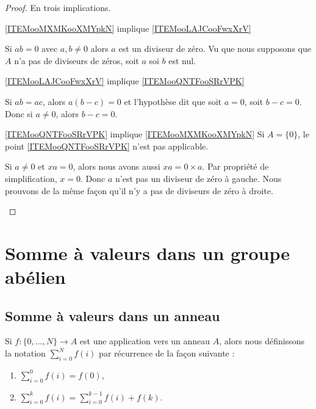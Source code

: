\begin{proof}
    En trois implications.
    \begin{subproof}
        \item[\ref{ITEMooMXMKooXMYpkN} implique \ref{ITEMooLAJCooFwxXrV}]

            Si \( ab=0\) avec \( a,b\neq 0\) alors \( a\) est un diviseur de zéro. Vu que nous supposons que \( A\) n'a pas de diviseurs de zéros, soit \( a\) soi \( b\) est nul.
        \item[\ref{ITEMooLAJCooFwxXrV} implique \ref{ITEMooQNTFooSRrVPK}]

            Si \( ab=ac\), alors \( a(b-c)=0\) et l'hypothèse dit que soit \( a=0\), soit \( b-c=0\). Donc si \( a\neq 0\), alors \( b-c=0\).
        \item[\ref{ITEMooQNTFooSRrVPK} implique \ref{ITEMooMXMKooXMYpkN}]
            Si \( A=\{ 0 \}\), le point \ref{ITEMooQNTFooSRrVPK} n'est pas applicable.

            Si \( a\neq 0\) et \( xa=0\), alors nous avons aussi \( xa=0\times a\). Par propriété de simplification, \( x=0\). Donc \( a\) n'est pas un diviseur de zéro à gauche. Nous prouvons de la même façon qu'il n'y a pas de diviseurs de zéro à droite.
    \end{subproof}
\end{proof}

\section{Somme à valeurs dans un groupe abélien}

\subsection{Somme à valeurs dans un anneau}

\begin{definition}      \label{DEFooNEVNooJlmJOC}
    Si \( f\colon \{ 0,\ldots, N \}\to A\) est une application vers un anneau \( A\), alors nous définissons la notation \( \sum_{i=0}^Nf(i)\) par récurrence de la façon suivante :
    \begin{enumerate}
        \item
            \( \sum_{i=0}^0f(i)=f(0)\),
        \item
            \( \sum_{i=0}^{k}f(i)=\sum_{i=0}^{k-1}f(i)+f(k)\).
    \end{enumerate}
\end{definition}

